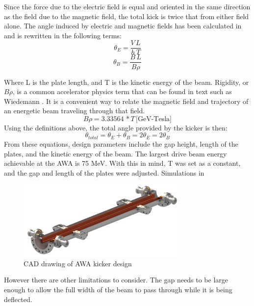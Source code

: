 Since the force due to the electric field is equal and oriented in the same direction as the field due to the magnetic field, 
the total kick is twice that from either field alone.  
The angle induced by electric and magnetic fields has been calculated in \cite{iukicker, Wiedemann}
and is rewritten in the following terms:  
\begin{equation}
\theta_E= \frac{V\,L}{h\,T}
\end{equation}
\begin{equation}
\theta_B= \frac{B\,L}{B\rho}
\end{equation}

Where L is the plate length, and T is the kinetic energy of the beam. 
Rigidity, or $B\rho$, is a common accelerator physics term that can be found in text such as Wiedemann \cite{Wiedemann}. 
It is a convenient way to relate the magnetic field and trajectory of an energetic beam traveling through that field.
\begin{equation}
	B\rho=3.33564\,*T\, \text{[GeV-Tesla]}
\end{equation} 
Using the definitions above, the total angle provided by the kicker is then: 
\begin{equation}
\theta_{total}= \theta_E+\theta_B=2\theta_E=2\theta_B
\end{equation}
From these equations, design parameters include the gap height, length of the plates, and 
the kinetic energy of the beam. The largest drive beam energy achievable at the AWA is 75 MeV. 
With this in mind, T was set as a constant, and the gap and length of the plates were adjusted.
Simulations in 
\begin{figure}[h]
	\begin{center}
		\includegraphics[width=0.75\textwidth]{./images/kicker}\caption{CAD drawing of AWA kicker design }
		\label{fig:AWAkicker}
	\end{center}
\end{figure}

However there are other limitations to consider. The gap needs to be large enough 
to allow the full width of the beam to pass through while it is being deflected.


